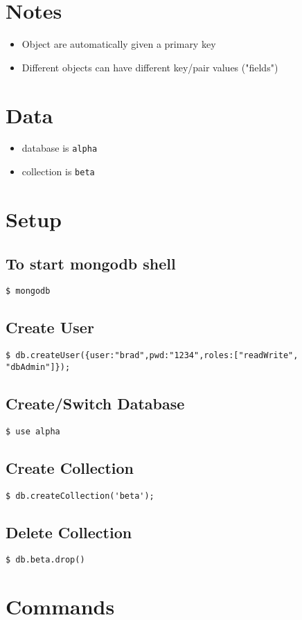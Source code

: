 \documentclass{article}
\title{\vspace{-2.25cm}{\small MongoDB}\vspace{-1.5cm}}
\date{}
\begin{document}
\maketitle
\begin{multicols}{3}
\section{Notes}
\begin{itemize}
\item Object are automatically given a primary key
\item Different objects can have different key/pair values ("fields")
\end{itemize}
\section{Data}
\begin{itemize}
\item database is \texttt{alpha}
\item collection is \texttt{beta}
\end{itemize}
\section{Setup}
\subsection{To start mongodb shell}
\lstinline|$ mongodb|
\subsection{Create User}
\lstinline|$ db.createUser({user:"brad",pwd:"1234",roles:["readWrite", "dbAdmin"]});|
\subsection{Create/Switch Database}
\lstinline|$ use alpha|
\subsection{Create Collection}
\lstinline|$ db.createCollection('beta');|
\subsection{Delete Collection}
\lstinline|$ db.beta.drop()|
\section{Commands}

\end{multicols}
\end{document}
